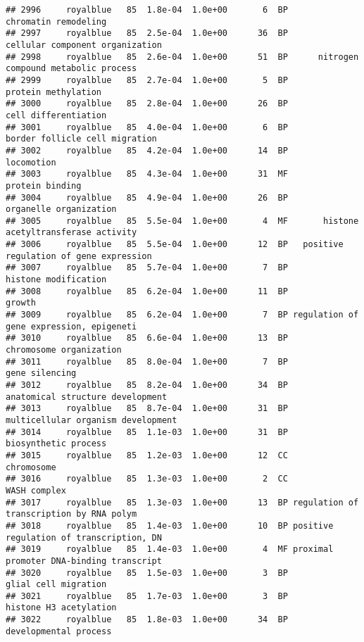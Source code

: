 \documentclass[]{article}
\begin{document}
\begin{verbatim}
## 2996     royalblue   85  1.8e-04  1.0e+00       6  BP                     chromatin remodeling
## 2997     royalblue   85  2.5e-04  1.0e+00      36  BP          cellular component organization
## 2998     royalblue   85  2.6e-04  1.0e+00      51  BP      nitrogen compound metabolic process
## 2999     royalblue   85  2.7e-04  1.0e+00       5  BP                      protein methylation
## 3000     royalblue   85  2.8e-04  1.0e+00      26  BP                     cell differentiation
## 3001     royalblue   85  4.0e-04  1.0e+00       6  BP           border follicle cell migration
## 3002     royalblue   85  4.2e-04  1.0e+00      14  BP                               locomotion
## 3003     royalblue   85  4.3e-04  1.0e+00      31  MF                          protein binding
## 3004     royalblue   85  4.9e-04  1.0e+00      26  BP                   organelle organization
## 3005     royalblue   85  5.5e-04  1.0e+00       4  MF       histone acetyltransferase activity
## 3006     royalblue   85  5.5e-04  1.0e+00      12  BP   positive regulation of gene expression
## 3007     royalblue   85  5.7e-04  1.0e+00       7  BP                     histone modification
## 3008     royalblue   85  6.2e-04  1.0e+00      11  BP                                   growth
## 3009     royalblue   85  6.2e-04  1.0e+00       7  BP regulation of gene expression, epigeneti
## 3010     royalblue   85  6.6e-04  1.0e+00      13  BP                  chromosome organization
## 3011     royalblue   85  8.0e-04  1.0e+00       7  BP                           gene silencing
## 3012     royalblue   85  8.2e-04  1.0e+00      34  BP         anatomical structure development
## 3013     royalblue   85  8.7e-04  1.0e+00      31  BP       multicellular organism development
## 3014     royalblue   85  1.1e-03  1.0e+00      31  BP                     biosynthetic process
## 3015     royalblue   85  1.2e-03  1.0e+00      12  CC                               chromosome
## 3016     royalblue   85  1.3e-03  1.0e+00       2  CC                             WASH complex
## 3017     royalblue   85  1.3e-03  1.0e+00      13  BP regulation of transcription by RNA polym
## 3018     royalblue   85  1.4e-03  1.0e+00      10  BP positive regulation of transcription, DN
## 3019     royalblue   85  1.4e-03  1.0e+00       4  MF proximal promoter DNA-binding transcript
## 3020     royalblue   85  1.5e-03  1.0e+00       3  BP                     glial cell migration
## 3021     royalblue   85  1.7e-03  1.0e+00       3  BP                   histone H3 acetylation
## 3022     royalblue   85  1.8e-03  1.0e+00      34  BP                    developmental process

\end{verbatim}
\end{document}
